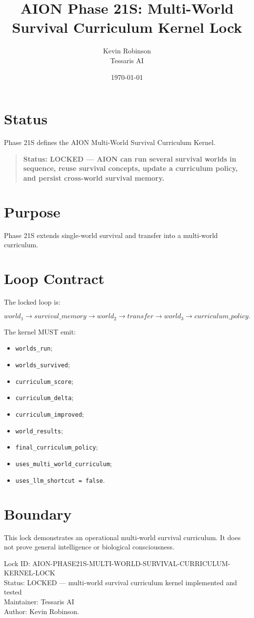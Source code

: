 \documentclass[11pt,a4paper]{article}
\title{\textbf{AION Phase 21S: Multi-World Survival Curriculum Kernel Lock}}
\author{Kevin Robinson\\Tessaris AI}
\date{\today}
\begin{document}
\maketitle

\section{Status}

Phase 21S defines the AION Multi-World Survival Curriculum Kernel.

\begin{quote}
\textbf{Status: LOCKED --- AION can run several survival worlds in sequence, reuse survival concepts, update a curriculum policy, and persist cross-world survival memory.}
\end{quote}

\section{Purpose}

Phase 21S extends single-world survival and transfer into a multi-world curriculum.

\section{Loop Contract}

The locked loop is:

\[
world_1 \rightarrow survival\_memory
\rightarrow world_2 \rightarrow transfer
\rightarrow world_3 \rightarrow curriculum\_policy.
\]

The kernel MUST emit:

\begin{itemize}
  \item \texttt{worlds\_run};
  \item \texttt{worlds\_survived};
  \item \texttt{curriculum\_score};
  \item \texttt{curriculum\_delta};
  \item \texttt{curriculum\_improved};
  \item \texttt{world\_results};
  \item \texttt{final\_curriculum\_policy};
  \item \texttt{uses\_multi\_world\_curriculum};
  \item \texttt{uses\_llm\_shortcut = false}.
\end{itemize}

\section{Boundary}

This lock demonstrates an operational multi-world survival curriculum. It does not prove general intelligence or biological consciousness.

\bigskip

\noindent
Lock ID: AION-PHASE21S-MULTI-WORLD-SURVIVAL-CURRICULUM-KERNEL-LOCK\\
Status: LOCKED --- multi-world survival curriculum kernel implemented and tested\\
Maintainer: Tessaris AI\\
Author: Kevin Robinson.
\end{document}
